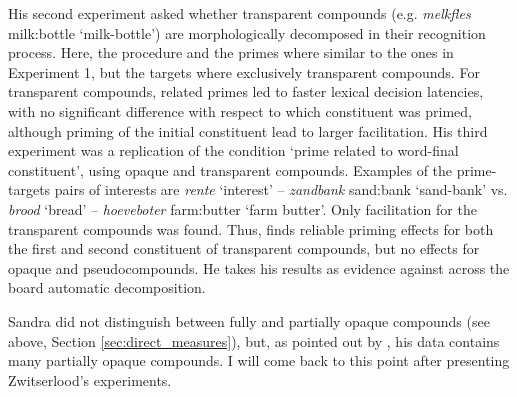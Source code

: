 His second experiment asked whether transparent compounds
(e.g. \emph{melkfles} milk:bottle `milk-bottle') are morphologically
decomposed in their recognition process. Here, the procedure and the
primes where similar to the ones in Experiment 1, but the targets
where exclusively transparent compounds.  For transparent compounds,
related primes led to faster lexical decision latencies, with no
significant difference with respect to which constituent was primed,
although priming of the initial constituent lead to larger
facilitation.  His third experiment was a replication of the condition
`prime related to word-final constituent', using opaque and transparent
compounds. 
Examples of the prime-targets pairs of interests are
\emph{rente} `interest' -- \emph{zandbank} sand:bank `sand-bank'
vs. \emph{brood} `bread' -- \emph{hoeveboter} farm:butter `farm butter'. Only
facilitation for the transparent compounds was found. Thus,
\citet{Sandra:1990} finds reliable priming effects for both the first
and second constituent of transparent compounds, but no effects for
opaque and pseudocompounds.  He takes his results as evidence
against across the board automatic decomposition.

Sandra did not distinguish between fully and partially opaque compounds (see above, Section \ref{sec:direct_measures}), but, as
pointed out by \citet[363]{Zwitserlood:1994}, his data contains many
partially opaque compounds. I will come back to this point after
presenting Zwitserlood's experiments.\label{ZwitserloodOnSandraOO}

